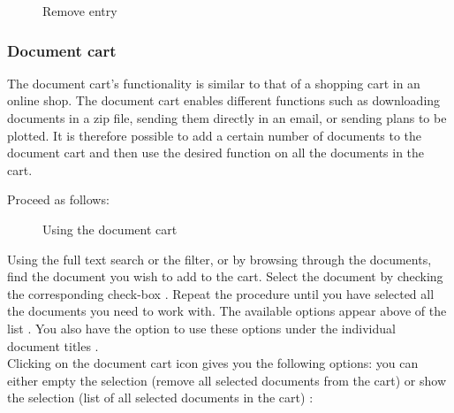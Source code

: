 \begin{figure}[H]
\caption{Remove entry}
\end{figure}


\subsubsection{Document cart}
\label{bkm:Ref201705445}

The document cart's functionality is similar to that of a shopping cart in an online shop. The document cart enables different functions such as downloading documents in a zip file, sending them directly in an email, or sending plans to be plotted. It is therefore possible to add a certain number of documents to the document cart and then use the desired function on all the documents in the cart.

\vspace{\baselineskip}

Proceed as follows:

\begin{figure}[H]
\caption{Using the document cart}
\end{figure}

Using the full text search or the filter, or by browsing through the documents, find the document you wish to add to the cart. Select the document by checking the corresponding check-box . Repeat the procedure until you have selected all the documents you need to work with. The available options appear above of the list . You also have the option to use these options under the individual document titles . \\
Clicking on the document cart icon  gives you the following options: you can either empty the selection (remove all selected documents from the cart)  or show the selection (list of all selected documents in the cart) :
\begin{figure}[H]
\end{figure}

